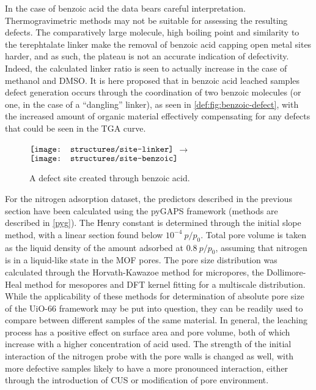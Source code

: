 In the case of benzoic acid the data bears careful interpretation. 
Thermogravimetric methods may not be suitable 
for assessing the resulting defects. The comparatively large molecule,
high boiling point and similarity to the terephtalate linker
make the removal of benzoic acid capping open metal sites harder, and
as such, the plateau is not an accurate indication of defectivity.
Indeed, the calculated linker ratio is seen to actually increase in 
the case of methanol and DMSO. It is here proposed that in benzoic acid 
leached samples defect generation occurs through the coordination
of two benzoic molecules (or one, in the case of a ``dangling'' linker), 
as seen in \autoref{def:fig:benzoic-defect},
with the increased amount of organic material effectively compensating
for any defects that could be seen in the TGA curve.

\begin{figure}[htb]
    \centering
    \( \vcenter{\hbox{\texttt{[image: structures/site-linker]}}}\)%
    \( \longrightarrow \)%
    \(\vcenter{\hbox{\texttt{[image: structures/site-benzoic]}}}\)
    \caption{A defect site created through benzoic acid.}%
    \label{def:fig:benzoic-defect}
\end{figure}

For the nitrogen adsorption dataset, the predictors described in the 
previous section have been calculated using the pyGAPS framework
(methods are described in \autoref{pyg}). The Henry constant is determined 
through the initial slope method, with a linear section found below 
\(10^{-4}~p/p_0\). Total pore volume is taken as the liquid density
of the amount adsorbed at \(0.8~p/p_0\), assuming that 
nitrogen is in a liquid-like state in the MOF pores. The pore
size distribution was calculated through the Horvath-Kawazoe
method for micropores, the Dollimore-Heal method for mesopores
and DFT kernel fitting for a multiscale distribution. While 
the applicability of these methods for determination of absolute
pore size of the UiO-66 framework may be put into question, 
they can be readily used to compare between different samples
of the same material.
In general, the leaching process has a positive effect on 
surface area and pore volume, both of which increase 
with a higher concentration of acid used. The strength of 
the initial interaction of the nitrogen probe with the pore 
walls is changed as well, with more defective samples likely
to have a more pronounced interaction, either through the introduction
of CUS or modification of pore environment.


